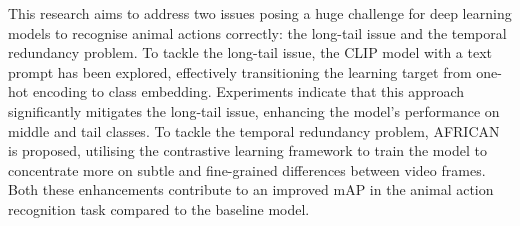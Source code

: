 This research aims to address two issues posing a huge challenge for deep learning models to recognise animal actions correctly: the long-tail issue and the temporal redundancy problem. To tackle the long-tail issue, the CLIP model with a text prompt has been explored, effectively transitioning the learning target from one-hot encoding to class embedding. Experiments indicate that this approach significantly mitigates the long-tail issue, enhancing the model's performance on middle and tail classes. To tackle the temporal redundancy problem, AFRICAN is proposed, utilising the contrastive learning framework to train the model to concentrate more on subtle and fine-grained differences between video frames. Both these enhancements contribute to an improved mAP in the animal action recognition task compared to the baseline model.

